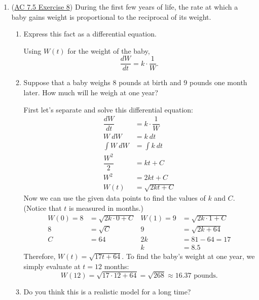 \begin{enumerate}[leftmargin=0pt]
\item (\href{https://faculty.gvsu.edu/boelkinm/Home/ACS/sec-7-5-modeling.html#DfO}{AC 7.5 Exercise 8}) During the first few years of life, the rate at which a baby gains weight is proportional to the reciprocal of its weight.
\begin{enumerate}
    \item Express this fact as a differential equation.

    \begin{red}
        Using $W(t)$ for the weight of the baby,
        \[\dfrac{dW}{dt} = k\cdot\dfrac{1}{W}.\]
    \end{red}
    \item Suppose that a baby weighs 8 pounds at birth and 9 pounds one month later. How much will he weigh at one year?

    \begin{red}
        First let's separate and solve this differential equation:
        \begin{align*}
            \dfrac{dW}{dt} &= k\cdot\dfrac{1}{W} \\
            W\ dW &= k \ dt \\
            \int W\ dW &= \int k\ dt \\
            \dfrac{W^2}{2} &= kt + C \\
            W^2 &= 2kt + C \\
            W(t) &= \sqrt{2kt + C}
        \end{align*}
        Now we can use the given data points to find the values of $k$ and $C$. (Notice that $t$ is measured in months.)
        \begin{align*}
            W(0) = 8 &= \sqrt{2k\cdot 0 + C} & 
            W(1) = 9 &= \sqrt{2k\cdot 1 + C} \\
            8 &= \sqrt{C} & 
            9 &= \sqrt{2k + 64} \\
            C &= 64 & 
            2k &= 81 - 64 = 17 \\
               &  &
            k &= 8.5
        \end{align*}
        Therefore, $W(t) = \sqrt{17t + 64}$. To find the baby's weight at one year, we simply evaluate at $t = 12$ months:
        \[W(12) = \sqrt{17\cdot 12 + 64} = \sqrt{268} \approx 16.37 \text{ pounds}.\]
    \end{red}
    \item Do you think this is a realistic model for a long time?
    

\end{enumerate}
\end{enumerate}
